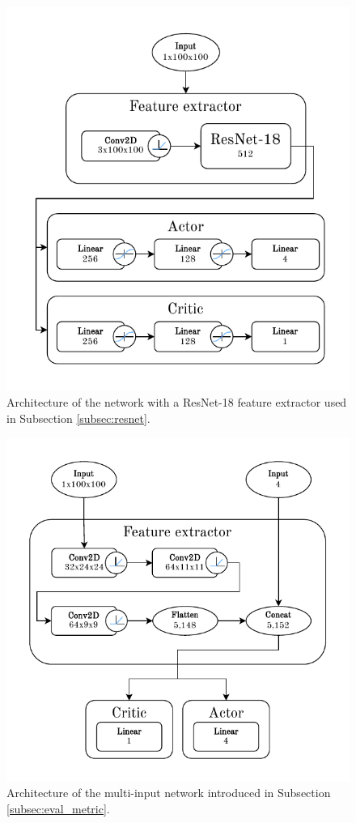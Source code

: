 \documentclass[
  digital,     %
  oneside,     %
  nosansbold,  %
  nocolorbold, %
  lof,         %
  lot,         %
]{fithesis4}
\begin{document}
\begin{figure}
    \includegraphics[width=1\linewidth]{diagrams/resnet_arch.pdf}
    \caption{Architecture of the network with a ResNet-18 feature extractor used in Subsection \ref{subsec:resnet}.}
    \label{fig:resnet_arch}
\end{figure}

\begin{figure}
    \includegraphics[width=1\linewidth]{diagrams/combined_policy.pdf}
    \caption{Architecture of the multi-input network introduced in Subsection \ref{subsec:eval_metric}.}
    \label{fig:multiinput_arch}
\end{figure}
\end{document}
